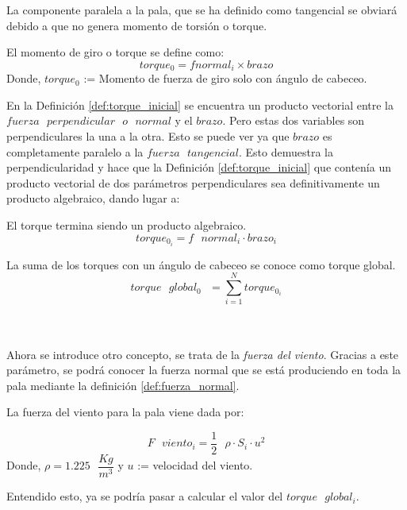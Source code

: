   La componente paralela a la pala, que se ha definido como tangencial se obviará debido a que no genera momento de torsión o torque. 
  
  \begin{definicion}
El momento de giro o torque se define como:
 $$ torque_0 = f normal_i \times brazo$$
Donde,
\centering $torque_0$ := Momento de fuerza de giro solo con ángulo de cabeceo.
  \label{def:torque_inicial}
 \end{definicion}
 

 En la Definición \ref{def:torque_inicial} se encuentra un producto vectorial entre la $fuerza  \text{ }perpendicular \text{ } o \text{ } normal$ y el $brazo$. Pero estas dos variables son perpendiculares la una a la otra. Esto se puede ver ya que $brazo$ es completamente paralelo a la $fuerza \text{ } tangencial$. Esto demuestra la perpendicularidad y hace que la Definición \ref{def:torque_inicial} que contenía un producto vectorial de dos parámetros perpendiculares sea definitivamente un producto algebraico, dando lugar a:
 
 
  \begin{definicion}
  El torque termina siendo un producto algebraico.
 $$ torque_0_{i} = f \text{ } normal_i \cdot brazo_i$$
 \label{def:torque_algebraico_inicial}
 \end{definicion}
 
 
 \begin{definicion}
 La suma de los torques con un ángulo de cabeceo se conoce como torque global.
 $$ torque \text{ } global_0 \text{ } = \sum_{i=1}^{N} torque_0_{i} $$
\label{def:torque_global}
\end{definicion}
 
 \\\\Ahora se introduce otro concepto, se trata de la \textit{fuerza del viento}. Gracias a este parámetro, se podrá conocer la fuerza normal que se está produciendo en toda la pala mediante la definición \ref{def:fuerza_normal}.
 
 
 \begin{definicion}
 La fuerza del viento para la pala viene dada por:
 
 $$ F \text{ } viento_i = \dfrac{1}{2} \text{ } \rho \cdot S_i \cdot u^2$$
Donde,
 \centering  $\rho = 1.225 \text{ } \dfrac{Kg}{m^3}$ y $u$ := velocidad del viento.
 \label{def:fuerza_viento_inicial}
 \end{definicion}
 
\vspace{15pt} Entendido esto, ya se podría pasar a calcular el valor del $torque \text{ } global_i$.
 
